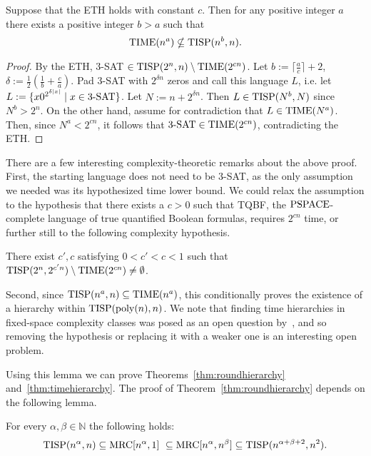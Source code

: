 \documentclass{llncs}
\newcommand{\mrc}{\textup{MRC}}
\newcommand{\TIME}{\textup{TIME}}
\newcommand{\TISP}{\textup{TISP}}
\newcommand{\PSPACE}{\textup{PSPACE}}
\begin{document}
\begin{lemma}\label{lemma:eth} Suppose that the ETH holds with constant $c$. Then
for any positive integer $a$ there exists a positive integer $b>a$ such that
$$\TIME(n^a) \nsubseteq \TISP(n^b, n).$$ \end{lemma}

\begin{proof}
By the ETH, 3-SAT $\in \TISP(2^n, n)\setminus \TIME(2^{cn})$. Let
$b:=\lceil\frac{a}{c}\rceil+2$, $\delta:=\frac12(\frac1b+\frac{c}{a})$. Pad
3-SAT with $2^{\delta n}$ zeros and call this language $L$, i.e. let $L:=\{x
0^{2^{\delta|x|}} \mid x \in \textup{3-SAT}\}$. Let $N:=n+2^{\delta n}$. Then
$L\in \TISP(N^b, N)$ since $N^b > 2^n$. On the other hand, assume for
contradiction that $L \in \TIME(N^a)$. Then, since $N^a < 2^{cn}$, it follows
that $\textup{3-SAT} \in \TIME(2^{cn})$, contradicting the ETH.
\end{proof}

There are a few interesting complexity-theoretic remarks about the above proof.
First, the starting language does not need to be 3-SAT, as the only assumption
we needed was its hypothesized time lower bound.  We could relax the assumption
to the hypothesis that there exists a $c>0$ such that TQBF,
the $\PSPACE$-complete language of true quantified Boolean formulas,
requires $2^{cn}$ time, or further still to the following complexity hypothesis.

\begin{conjecture} \label{conj:weaketh}
There exist $c',c$ satisfying $0 < c' < c < 1$ such that
$\TISP(2^n, 2^{c'n}) \setminus \TIME(2^{cn})\ne\emptyset$.
\end{conjecture}

Second, since $\TISP(n^a, n) \subseteq \TIME(n^a)$, this conditionally proves the
existence of a hierarchy within $\TISP(\textup{poly}(n), n)$. We note that
finding time hierarchies in fixed-space complexity classes was posed as an open
question by~\cite{WagnerW86}, and so removing the hypothesis or replacing it
with a weaker one is an interesting open problem.

Using this lemma we can prove Theorems~\ref{thm:roundhierarchy}
and~\ref{thm:timehierarchy}. The proof of Theorem~\ref{thm:roundhierarchy}
depends on the following lemma.

\begin{lemma} \label{lem:tisprelation}
For every $\alpha, \beta \in \mathbb N$ the following holds: $$ \TISP(n^\alpha,
n)  \subseteq \mrc[n^\alpha, 1] \ \subseteq \mrc[n^\alpha, n^\beta] \subseteq
\TISP(n^{\alpha+\beta+2}, n^2).$$
\end{lemma}
\end{document}
